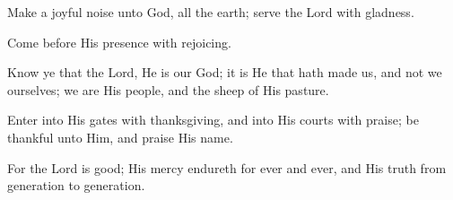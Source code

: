 Make a joyful noise unto God, all the earth; serve the Lord with gladness.

Come before His presence with rejoicing.

Know ye that the Lord, He is our God; it is He that hath made us, and not we ourselves; we are His people, and the sheep of His pasture.

Enter into His gates with thanksgiving, and into His courts with praise; be thankful unto Him, and praise His name.

For the Lord is good; His mercy endureth for ever and ever, and His truth from generation to generation.
